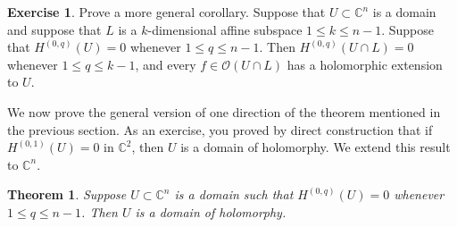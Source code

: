 \documentclass[12pt,openany]{book}
\newcommand{\C}{{\mathbb{C}}}
\newcommand{\sO}{{\mathscr{O}}}
\theoremstyle{plain}
\newtheorem{thm}{Theorem}[section]
\theoremstyle{remark}
\theoremstyle{definition}
\newenvironment{exbox}{%
    \def\FrameCommand{\vrule width 1pt \relax\hspace{10pt}}%
    \MakeFramed{\advance\hsize-\width\FrameRestore}%
}{%
    \endMakeFramed
}
\theoremstyle{exercise}
\newtheorem{exercise}{Exercise}[section]
\theoremstyle{example}
\begin{document}
\begin{exbox}
\begin{exercise}
Prove a more general corollary.
Suppose that $U \subset \C^n$ is a domain and suppose that
$L$ is a $k$-dimensional affine subspace $1 \leq k \leq n-1$.
Suppose that $H^{(0,q)}(U) = 0$ whenever $1 \leq q \leq n-1$.  Then
$H^{(0,q)}(U \cap L) = 0$ whenever $1 \leq q \leq k-1$,
and every $f \in \sO(U \cap L)$ has a holomorphic extension to $U$.
\end{exercise}
\end{exbox}

We now prove the general version of one direction of the theorem mentioned
in the previous section.  As an exercise, you proved by direct
construction that if $H^{(0,1)}(U) = 0$ in $\C^2$, then $U$ is a domain of
holomorphy.  We extend this result to $\C^n$.

\begin{thm} \label{thm:dolhomimpliesdoh}
Suppose $U \subset \C^n$ is a domain such that $H^{(0,q)}(U) = 0$
whenever $1 \leq q \leq n-1$.  Then $U$ is a domain of holomorphy.
\end{thm}
\end{document}
